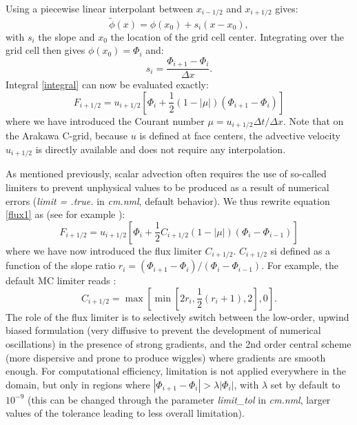 \documentclass[12pt,A4,french]{article}
\begin{document}
\begin{description}
Using a piecewise linear interpolant between $x_{i-1/2}$ and $x_{i+1/2}$ gives:
\begin{equation}
\widetilde{\phi}\left(x\right) = \phi\left(x_0\right) + s_i\left(x - x_0\right),
\end{equation}
with $s_i$ the slope and $x_0$ the location of the grid cell center. Integrating over the grid cell then gives $\phi\left(x_0\right) = \Phi_i$ and:
\begin{equation}
    s_i = \frac{\Phi_{i+1} - \Phi_i}{\Delta x}.
\end{equation}
Integral \ref{integral} can now be evaluated exactly:
\begin{equation}
F_{i+1/2} = u_{i+1/2}\left[\Phi_i + \frac{1}{2}\left(1 - \left|\mu\right|\right)\left(\Phi_{i+1} - \Phi_i\right)\right]
\label{flux1}
\end{equation}
where we have introduced the Courant number $\mu = u_{i+1/2} \Delta t / \Delta x$. Note that on the Arakawa C-grid, because $u$ is defined at face centers, the advective velocity $u_{i+1/2}$ is directly available and does not require any interpolation.

As mentioned previously, scalar advection often requires the use of so-called limiters to prevent unphysical values to be produced as a result of numerical errors ({\it limit = .true.} in {\it cm.nml}, default behavior). We thus rewrite equation \ref{flux1} as (see for example \cite{Dur2010}):
\begin{equation}
F_{i+1/2} = u_{i+1/2}\left[\Phi_i + \frac{1}{2}C_{i+1/2}\left(1 - \left|\mu\right|\right)\left(\Phi_{i} - \Phi_{i-1}\right)\right]
\label{flux2}
\end{equation}
where we have now introduced the flux limiter $C_{i+1/2}$. $C_{i+1/2}$ si defined as a function of the slope ratio $r_i = \left(\Phi_{i+1} - \Phi_i\right)/\left(\Phi_{i} - \Phi_{i-1}\right)$. For example, the default MC limiter reads \cite{VL1977}:
\begin{equation}
C_{i+1/2} = \max\left[\min\left[2r_i,\frac{1}{2}\left(r_i + 1\right),2\right],0\right].
\label{limiter}
\end{equation}
The role of the flux limiter is to selectively switch between the low-order, upwind biased formulation (very diffusive to prevent the development of numerical oscillations) in the presence of strong gradients, and the 2nd order central scheme (more dispersive and prone to produce wiggles) where gradients are smooth enough. For computational efficiency, limitation is not applied everywhere in the domain, but only in regions where $\left|\Phi_{i+1} - \Phi_i\right| > \lambda\left|\Phi_i\right|$, with $\lambda$ set by default to $10^{-9}$ (this can be changed through the parameter {\it limit\_tol} in {\it cm.nml}, larger values of the tolerance leading to less overall limitation).


\end{description}
\end{document}

